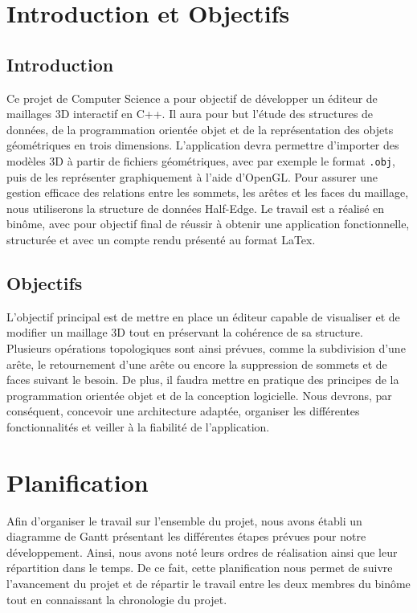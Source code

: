 \section{Introduction et Objectifs}
\subsection{Introduction}
Ce projet de Computer Science a pour objectif de développer un éditeur de maillages 3D interactif en C++. Il aura pour but l'étude des structures de données, de la programmation orientée objet et de la représentation des objets géométriques en trois dimensions.
\newline
\newline
L'application devra permettre d'importer des modèles 3D à partir de fichiers géométriques, avec par exemple le format \texttt{.obj}, puis de les représenter graphiquement à l'aide d'OpenGL. Pour assurer une gestion efficace des relations entre les sommets, les arêtes et les faces du maillage, nous utiliserons la structure de données Half-Edge.
\newline
\newline
Le travail est a réalisé en binôme, avec pour objectif final de réussir à obtenir une application fonctionnelle, structurée et avec un compte rendu présenté au format LaTex.

\subsection{Objectifs}
L'objectif principal est de mettre en place un éditeur capable de visualiser et de modifier un maillage 3D tout en préservant la cohérence de sa structure. Plusieurs opérations topologiques sont ainsi prévues, comme la subdivision d'une arête, le retournement d'une arête ou encore la suppression de sommets et de faces suivant le besoin.
\newline
\newline
De plus, il faudra mettre en pratique des principes de la programmation orientée objet et de la conception logicielle. Nous devrons, par conséquent, concevoir une architecture adaptée, organiser les différentes fonctionnalités et veiller à la fiabilité de l'application.

\section{Planification}
Afin d'organiser le travail sur l'ensemble du projet, nous avons établi un diagramme de Gantt présentant les différentes étapes prévues pour notre développement. Ainsi, nous avons noté leurs ordres de réalisation ainsi que leur répartition dans le temps. De ce fait, cette planification nous permet de suivre l'avancement du projet et de répartir le travail entre les deux membres du binôme tout en connaissant la chronologie du projet.

